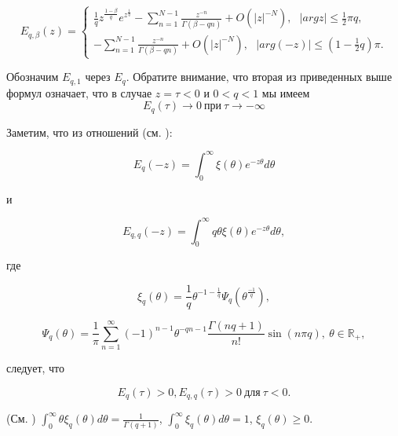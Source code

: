 \begin{equation}
    E_{q,\beta}(z) = 
    \begin{cases}
        \frac{1}{q}z^{\frac{1-\beta}{q}}e^{z^{\frac{1}{q}}} - \sum_{n=1}^{N-1}\frac{z^{-n}}{\Gamma(\beta-qn)} +
        O(|z|^{-N}), \ \ \ |argz| \leq \frac{1}{2} \pi q,\\
        - \sum_{n=1}^{N-1} \frac{z^{-n}}{\Gamma(\beta-qn)} + O(|z|^{-N}), \ \ \ |arg(-z)| \leq (1 - \frac{1}{2}q)\pi.
    \end{cases}
\end{equation}

Обозначим $E_{q,1}$ через $E_{q}$. Обратите внимание, что вторая из приведенных выше формул означает, что в случае
$z = \tau < 0$ и $0 < q < 1$ мы имеем
\begin{equation}
    E_{q}(\tau) \rightarrow 0 \ \text{при} \ \tau \rightarrow - \infty
\end{equation}

Заметим, что из отношений (см. \cite{wang}):

\begin{equation*}
    E_{q}(-z) = \int_{0}^{\infty} \xi(\theta)e^{-z\theta}d\theta
\end{equation*}

\noindent и

\begin{equation*}
    E_{q,q}(-z) = \int_{0}^{\infty} q\theta \xi(\theta)e^{-z\theta}d\theta,
\end{equation*}

\noindent где

\begin{equation}
    \xi_{q}(\theta) = \frac{1}{q} \theta^{-1-\frac{1}{q}}\Psi_{q}(\theta^{\frac{-1}{q}}),
\end{equation}

\begin{equation}
    \Psi_{q}(\theta) = \frac{1}{\pi} \sum_{n=1}^{\infty} (-1)^{n-1} \theta^{-qn-1} \frac{\Gamma(nq+1)}{n!} \sin(n \pi q), \ 
    \theta \in \mathbb{R}_{+},
\end{equation}

\noindent следует, что

\begin{equation}
    E_{q}(\tau) > 0, E_{q,q}(\tau) > 0 \ \text{для} \ \tau < 0.
\end{equation}

\begin{remark}
    (См. \cite{zhang}) $\int_{0}^{\infty} \theta \xi_{q}(\theta) d\theta = \frac{1}{\Gamma(q+1)}$,
    $\int_{0}^{\infty} \xi_{q}(\theta) d\theta = 1$, $\xi_{q}(\theta) \geq 0$.
\end{remark}

